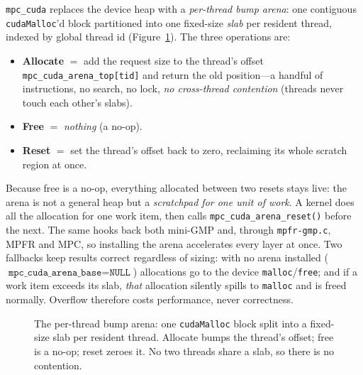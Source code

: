 \documentclass[11pt,a4paper]{article}
\newcommand{\code}[1]{\texttt{#1}}
\begin{document}
\code{mpc\_cuda} replaces the device heap with a \emph{per-thread bump arena}: one
contiguous \code{cudaMalloc}'d block partitioned into one fixed-size \emph{slab}
per resident thread, indexed by global thread id (Figure~\ref{fig:arena}). The
three operations are:
\begin{itemize}
  \item \textbf{Allocate} $=$ add the request size to the thread's offset
        \code{mpc\_cuda\_arena\_top[tid]} and return the old position---a handful
        of instructions, no search, no lock, \emph{no cross-thread contention}
        (threads never touch each other's slabs).
  \item \textbf{Free} $=$ \emph{nothing} (a no-op).
  \item \textbf{Reset} $=$ set the thread's offset back to zero, reclaiming its
        whole scratch region at once.
\end{itemize}
Because free is a no-op, everything allocated between two resets stays live: the
arena is not a general heap but a \emph{scratchpad for one unit of work}. A kernel
does all the allocation for one work item, then calls
\code{mpc\_cuda\_arena\_reset()} before the next. The same hooks back both
mini-GMP and, through \code{mpfr-gmp.c}, MPFR and MPC, so installing the arena
accelerates every layer at once. Two fallbacks keep results correct regardless of
sizing: with no arena installed ($\code{mpc\_cuda\_arena\_base}=\texttt{NULL}$)
allocations go to the device \code{malloc}/\code{free}; and if a work item exceeds
its slab, \emph{that} allocation silently spills to \code{malloc} and is freed
normally. Overflow therefore costs performance, never correctness.

\begin{figure}[h]
\centering
{}
\caption{The per-thread bump arena: one \code{cudaMalloc} block split into a
fixed-size slab per resident thread. Allocate bumps the thread's offset; free is a
no-op; reset zeroes it. No two threads share a slab, so there is no contention.}
\label{fig:arena}
\end{figure}
\end{document}
